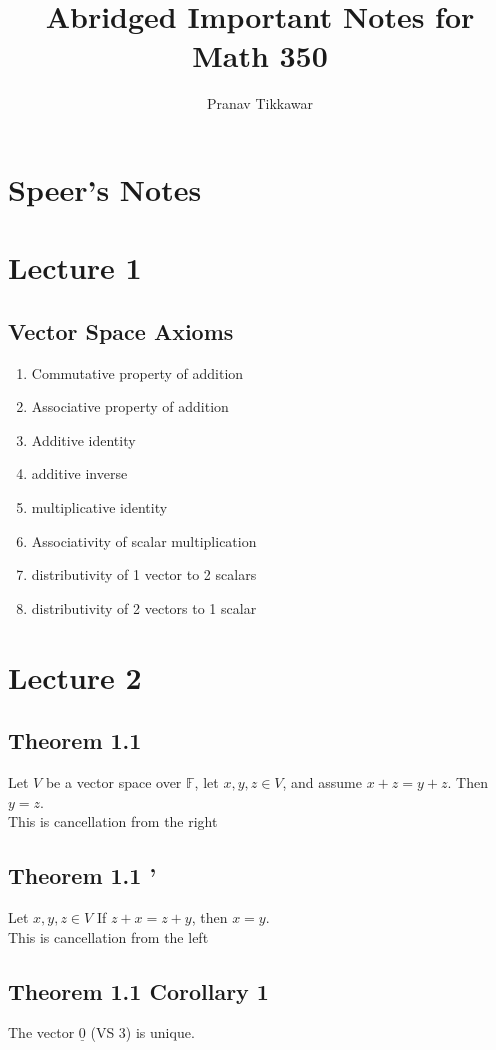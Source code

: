 \documentclass{article}
\author{Pranav Tikkawar}
\title{Abridged Important Notes for Math 350}
\begin{document}
\maketitle

\section{Speer's Notes}


\section{Lecture 1}
\subsection{Vector Space Axioms}
\begin{enumerate}
    \item Commutative property of addition
    \item Associative property of addition
    \item Additive identity 
    \item additive inverse
    \item multiplicative identity 
    \item Associativity of scalar multiplication
    \item distributivity of 1 vector to 2 scalars
    \item distributivity of 2 vectors to 1 scalar
\end{enumerate}

\section{Lecture 2}
\subsection{Theorem 1.1}
Let $V$ be a vector space over $\mathbb{F}$, let $x,y,z \in V$, and assume $x + z = y + z$. Then $y = z$.\\
This is cancellation from the right
\subsection{Theorem 1.1 '}
Let $x,y,z \in V$ If $z +x = z + y$, then $x = y$.\\
This is cancellation from the left
\subsection{Theorem 1.1 Corollary 1}
The vector $\underline{0}$ (VS 3) is unique.\\
\end{document}
